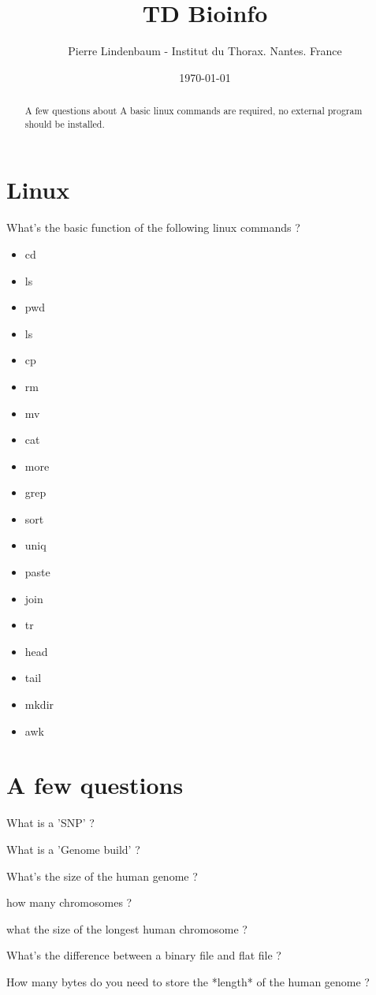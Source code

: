 \documentclass{article}
\title{TD Bioinfo}
\author{Pierre Lindenbaum - Institut du Thorax. Nantes. France}
\date{\today}
\begin{document}
\maketitle
\begin{abstract}
A few questions about
A basic linux commands are required, no external program should be installed.
\end{abstract}

\section{Linux}

What's the basic function of the following linux commands ?
\begin{itemize}
\item cd
\item ls
\item pwd
\item ls
\item cp
\item rm
\item mv
\item cat
\item more
\item grep
\item sort
\item uniq
\item paste
\item join
\item tr
\item head
\item tail
\item mkdir
\item awk
\end{itemize}


\section{A few questions}

What is a 'SNP' ? 

What is a 'Genome build' ?

What's the size of the human genome ?

how many chromosomes ?

what the size of the longest human chromosome ?

What's the difference between a binary file and flat file ?

How many bytes do you need to store the *length* of the human genome ?
\end{document}
